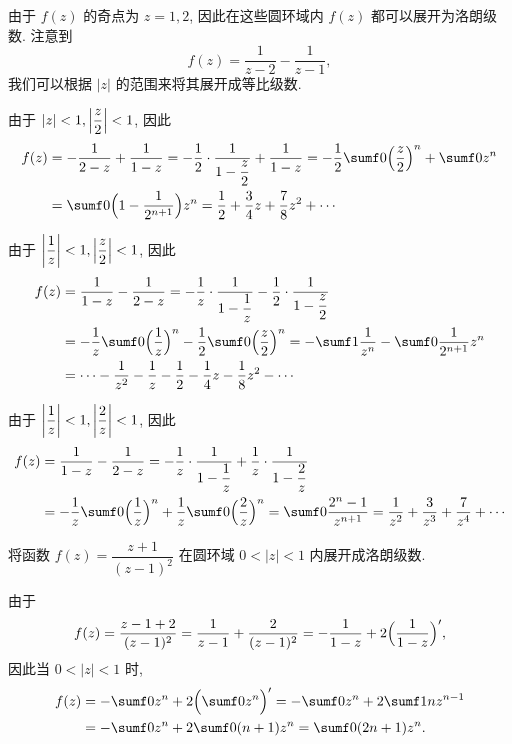 \begin{solution}
  由于 $f(z)$ 的奇点为 $z=1,2$, 因此在这些圆环域内 $f(z)$ 都可以展开为洛朗级数.
  注意到
  \[
    f(z)=\frac1{z-2}-\frac1{z-1},
  \]
  我们可以根据 $|z|$ 的范围来将其展开成等比级数.
  \begin{enumr}
    \item 由于 $|z|<1,\left|\dfrac z2\right|<1$, 因此
      \begin{align*}
         f(z)&
        =-\frac1{2-z}+\frac1{1-z}
        =-\half\cdot\frac1{1-\dfrac z2}+\frac1{1-z}
        =-\half\sumf0 \Bigl(\frac z2\Bigr)^n+\sumf0 z^n\\&
        =\sumf0 \Bigl(1-\frac1{2^{n+1}}\Bigr)z^n
        =\frac12+\frac34z+\frac78z^2+\cdots
      \end{align*}
    \item 由于 $\left|\dfrac 1z\right|<1,\left|\dfrac z2\right|<1$, 因此
      \begin{align*}
         f(z)&
        =\frac1{1-z}-\frac1{2-z}
        =-\frac1z\cdot\frac1{1-\dfrac1z}-\half\cdot\frac1{1-\dfrac z2}\\&
        =-\frac1z\sumf0 \Bigl(\frac1z\Bigr)^n-\half\sumf0 \Bigl(\frac z2\Bigr)^n
        =-\sumf1 \frac1{z^n}-\sumf0 \frac1{2^{n+1}}z^n\\&
        =\cdots-\frac1{z^2}-\frac1z-\half -\frac14z-\frac18z^2-\cdots
      \end{align*}
    \item 由于 $\left|\dfrac 1z\right|<1,\left|\dfrac 2z\right|<1$, 因此
      \begin{align*}
         f(z)&
        =\frac1{1-z}-\frac1{2-z}
        =-\frac1z\cdot\frac1{1-\dfrac1z}+\frac1z\cdot\frac1{1-\dfrac2z}\\&
        =-\frac1z\sumf0 \Bigl(\frac1z\Bigr)^n+\frac1z\sumf0 \Bigl(\frac2z\Bigr)^n
        =\sumf0 \frac{2^n-1}{z^{n+1}}
        =\frac1{z^2}+\frac3{z^3}+\frac7{z^4}+\cdots
      \end{align*}
  \end{enumr}
\end{solution}

\begin{example}
  将函数 $f(z)=\dfrac{z+1}{(z-1)^2}$ 在圆环域 $0<|z|<1$ 内展开成洛朗级数.
\end{example}

\begin{solution}[解法一]
  由于
  \[
     f(z)
    =\frac{z-1+2}{(z-1)^2}
    =\frac1{z-1}+\frac{2}{(z-1)^2}
    =-\frac1{1-z}+2\Bigl(\frac1{1-z}\Bigr)',
  \]
  因此当 $0<|z|<1$ 时,
  \begin{align*}
      f(z)&
    =-\sumf0 z^n+2\Bigl(\sumf0 z^n\Bigr)'
    =-\sumf0 z^n+2\sumf1 nz^{n-1}\\&
    =-\sumf0 z^n+2\sumf0 (n+1)z^n
    =\sumf0 (2n+1)z^n.
  \end{align*}
\end{solution}

